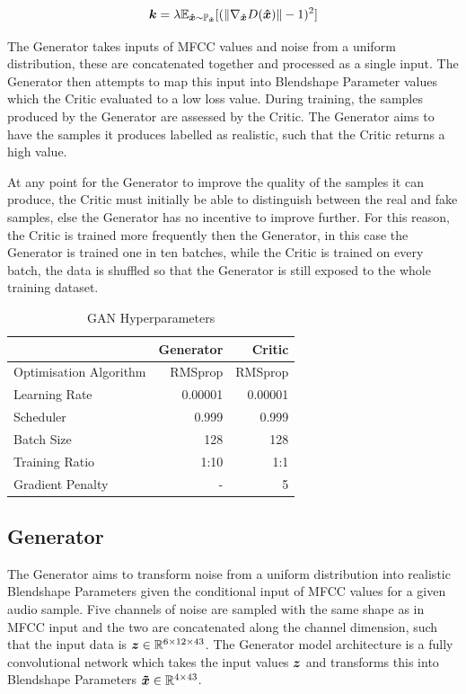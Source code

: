 \begin{equation}\label{eq:grad_penalty}
    {\boldsymbol{{k}}} = \lambda \mathbb{E}_{{\boldsymbol{{\hat{x}}}} \sim \mathbb{P}_{{\boldsymbol{{\hat{x}}}}}} 
            [(\| \nabla_{{\boldsymbol{{\hat{x}}}}} D({\boldsymbol{{\hat{x}}}}) \| - 1)^2]
\end{equation}

The Generator takes inputs of MFCC values and noise from a uniform distribution, these are concatenated together and processed as a single input.
The Generator then attempts to map this input into Blendshape Parameter values which the Critic evaluated to a low loss value. 
During training, the samples produced by the Generator are assessed by the Critic.
The Generator aims to have the samples it produces labelled as realistic, such that the Critic returns a high value.

At any point for the Generator to improve the quality of the samples it can produce, the Critic must initially be able to distinguish between the real and fake samples, else the Generator has no incentive to improve further.
For this reason, the Critic is trained more frequently then the Generator, in this case the Generator is trained one in ten batches, while the Critic is trained on every batch, the data is shuffled so that the Generator is still exposed to the whole training dataset.

\begin{table}[h!]
\centering
    \begin{tabular}{l | r | r}
    & \textbf{Generator} & \textbf{Critic}\\
    \hline
    Optimisation Algorithm & RMSprop & RMSprop \\
    Learning Rate          & 0.00001 & 0.00001 \\
    Scheduler              & 0.999   & 0.999   \\
    Batch Size             & 128     & 128     \\
    Training Ratio         & 1:10    & 1:1     \\
    Gradient Penalty       & -       & 5       \\
    \end{tabular} 
    \caption{GAN Hyperparameters}\label{table:gan_hyperparameters}
\end{table}

\subsection{Generator}
The Generator aims to transform noise from a uniform distribution into realistic Blendshape Parameters given the conditional input of MFCC values for a given audio sample.
Five channels of noise are sampled with the same shape as in MFCC input and the two are concatenated along the channel dimension, such that the input data is ${\boldsymbol{{z}}} \in \mathbb{R}^{6 \times 12 \times 43}$.
The Generator model architecture is a fully convolutional network which takes the input values ${\boldsymbol{{z}}}$ and transforms this into Blendshape Parameters ${\boldsymbol{{\tilde{x}}}} \in \mathbb{R}^{4 \times 43}$.

